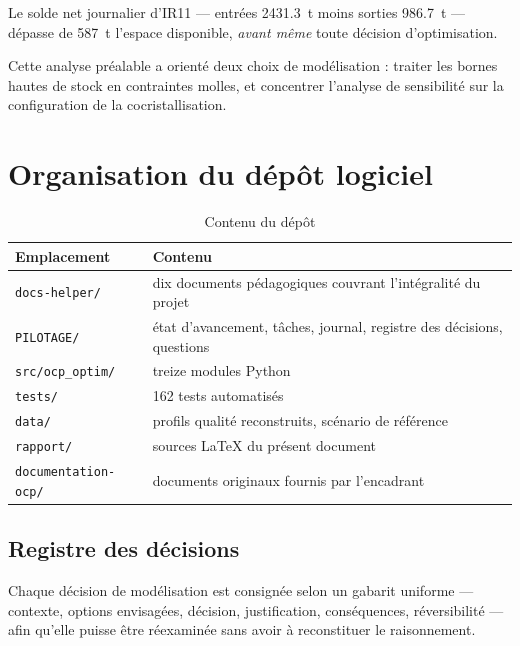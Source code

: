 \begin{encadre}
Le solde net journalier d'IR11 --- entrées \SI{2431,3}{\tonne} moins sorties
\SI{986,7}{\tonne} --- dépasse de \SI{587}{\tonne} l'espace disponible, \emph{avant même}
toute décision d'optimisation.

Cette analyse préalable a orienté deux choix de modélisation : traiter les bornes hautes de
stock en contraintes molles, et concentrer l'analyse de sensibilité sur la configuration de
la cocristallisation.
\end{encadre}

\chapter{Organisation du dépôt logiciel}
\label{ann:depot}

\begin{table}[H]
\centering
\caption{Contenu du dépôt}
\label{tab:depot}
\begin{tabular}{@{}lp{8.5cm}@{}}
\toprule
\textbf{Emplacement} & \textbf{Contenu} \\
\midrule
\texttt{docs-helper/} & dix documents pédagogiques couvrant l'intégralité du projet \\
\texttt{PILOTAGE/} & état d'avancement, tâches, journal, registre des décisions, questions \\
\texttt{src/ocp\_optim/} & treize modules Python \\
\texttt{tests/} & 162 tests automatisés \\
\texttt{data/} & profils qualité reconstruits, scénario de référence \\
\texttt{rapport/} & sources \LaTeX{} du présent document \\
\texttt{documentation-ocp/} & documents originaux fournis par l'encadrant \\
\bottomrule
\end{tabular}
\end{table}

\section{Registre des décisions}

Chaque décision de modélisation est consignée selon un gabarit uniforme --- contexte,
options envisagées, décision, justification, conséquences, réversibilité --- afin qu'elle
puisse être réexaminée sans avoir à reconstituer le raisonnement.


